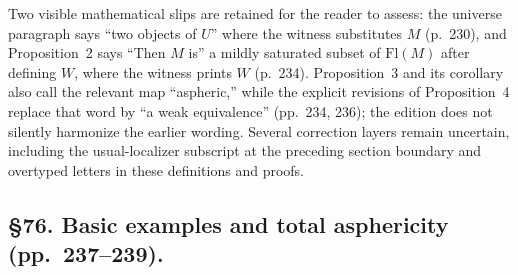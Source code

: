 \documentclass[10pt,oneside]{book}
\begin{document}
Two visible mathematical slips are retained for the reader to assess: the universe paragraph says “two objects of $U$” where the witness substitutes $M$ (p.\ 230), and Proposition~2 says “Then $M$ is” a mildly saturated subset of $\mathrm{Fl}(M)$ after defining $W$, where the witness prints $W$ (p.\ 234). Proposition~3 and its corollary also call the relevant map “aspheric,” while the explicit revisions of Proposition~4 replace that word by “a weak equivalence” (pp.\ 234, 236); the edition does not silently harmonize the earlier wording. Several correction layers remain uncertain, including the usual-localizer subscript at the preceding section boundary and overtyped letters in these definitions and proofs.

\subsection*{\S76. Basic examples and total asphericity (pp.\ 237--239).}
\end{document}
